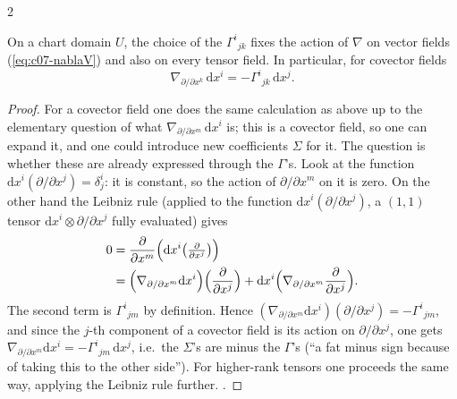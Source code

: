 \begin{paracol}{2}
\begin{proposition}\label{prop:c07-fix}
On a chart domain $U$, the choice of the $\Gamma^i{}_{jk}$ fixes the action of $\nabla$ on vector fields (\cref{eq:c07-nablaV}) and also on every tensor field. In particular, for covector fields
\[
  \nabla_{\partial/\partial x^k}\,\mathrm dx^i=-\Gamma^i{}_{jk}\,\mathrm dx^j.
\]
\end{proposition}
\begin{proof}
For a covector field one does the same calculation as above up to the elementary question of what $\nabla_{\partial/\partial x^m}\,\mathrm dx^i$ is; this is a covector field, so one can expand it, and one could introduce new coefficients $\Sigma$ for it. The question is whether these are already expressed through the $\Gamma$'s. Look at the function $\mathrm dx^i(\partial/\partial x^j)=\delta^i_j$: it is constant, so the action of $\partial/\partial x^m$ on it is zero. On the other hand the Leibniz rule (applied to the function $\mathrm dx^i(\partial/\partial x^j)$, a $(1,1)$ tensor $\mathrm dx^i\otimes\partial/\partial x^j$ fully evaluated) gives
\begin{align*}
  0&=\frac{\partial}{\partial x^m}\Bigl(\mathrm dx^i\bigl(\tfrac{\partial}{\partial x^j}\bigr)\Bigr)\\ &=\Bigl(\nabla_{\partial/\partial x^m}\mathrm dx^i\Bigr)\Bigl(\frac{\partial}{\partial x^j}\Bigr)+\mathrm dx^i\Bigl(\nabla_{\partial/\partial x^m}\frac{\partial}{\partial x^j}\Bigr).
\end{align*}
The second term is $\Gamma^i{}_{jm}$ by definition. Hence $(\nabla_{\partial/\partial x^m}\mathrm dx^i)(\partial/\partial x^j)=-\Gamma^i{}_{jm}$, and since the $j$-th component of a covector field is its action on $\partial/\partial x^j$, one gets $\nabla_{\partial/\partial x^m}\mathrm dx^i=-\Gamma^i{}_{jm}\,\mathrm dx^j$, i.e.\ the $\Sigma$'s are minus the $\Gamma$'s (``a fat minus sign because of taking this to the other side''). For higher-rank tensors one proceeds the same way, applying the Leibniz rule further.
.
\end{proof}


\end{paracol}
